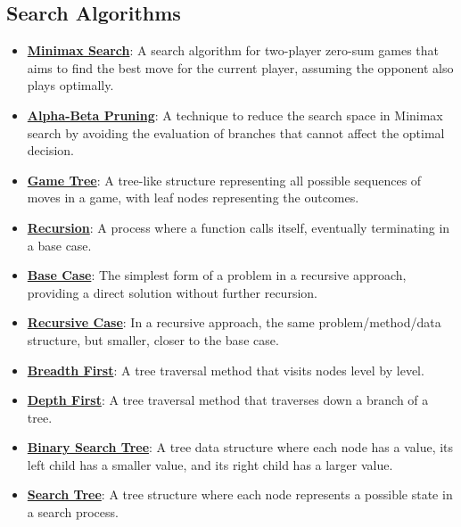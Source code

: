 \documentclass{article}%
\begin{document}
\subsection{Search Algorithms}%
\label{subsec:SearchAlgorithms}%
\begin{itemize}[leftmargin=*]%
\item \href{https://www.math.purdue.edu/~yipn/351/02L2-Intro.pdf#page=22}{\textbf{Minimax Search}}: A search algorithm for two-player zero-sum games that aims to find the best move for the current player, assuming the opponent also plays optimally.%
\item \href{https://www.math.purdue.edu/~yipn/351/02L2-Intro.pdf#page=23}{\textbf{Alpha-Beta Pruning}}: A technique to reduce the search space in Minimax search by avoiding the evaluation of branches that cannot affect the optimal decision.%
\item \href{https://www.math.purdue.edu/~yipn/351/02L2-Intro.pdf#page=11}{\textbf{Game Tree}}: A tree-like structure representing all possible sequences of moves in a game, with leaf nodes representing the outcomes.%
\item \href{https://www.math.purdue.edu/~yipn/351/14L1-DepthFS.pdf#page=2}{\textbf{Recursion}}: A process where a function calls itself, eventually terminating in a base case.%
\item \href{https://www.math.purdue.edu/~yipn/351/14L1-DepthFS.pdf#page=5}{\textbf{Base Case}}: The simplest form of a problem in a recursive approach, providing a direct solution without further recursion.%
\item \href{https://www.math.purdue.edu/~yipn/351/14L1-DepthFS.pdf#page=5}{\textbf{Recursive Case}}: In a recursive approach, the same problem/method/data structure, but smaller, closer to the base case.%
\item \href{https://www.math.purdue.edu/~yipn/351/14L1-DepthFS.pdf#page=8}{\textbf{Breadth First}}: A tree traversal method that visits nodes level by level.%
\item \href{https://www.math.purdue.edu/~yipn/351/14L1-DepthFS.pdf#page=8}{\textbf{Depth First}}: A tree traversal method that traverses down a branch of a tree.%
\item \href{https://www.math.purdue.edu/~yipn/351/14L1-DepthFS.pdf#page=9}{\textbf{Binary Search Tree}}: A tree data structure where each node has a value, its left child has a smaller value, and its right child has a larger value.%
\item \href{https://www.math.purdue.edu/~yipn/351/14L1-DepthFS.pdf#page=11}{\textbf{Search Tree}}: A tree structure where each node represents a possible state in a search process.%

\end{itemize}
\end{document}

